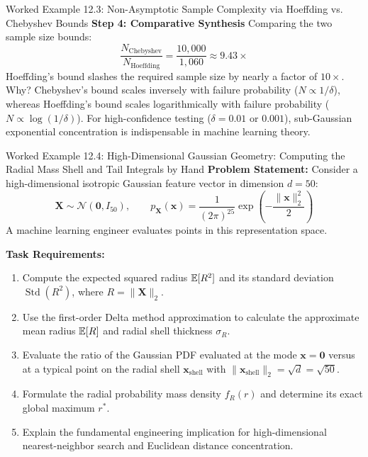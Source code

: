 \begin{examplebox}[breakable]{Worked Example 12.3: Non-Asymptotic Sample Complexity via Hoeffding vs. Chebyshev Bounds}
\textbf{Step 4: Comparative Synthesis}
Comparing the two sample size bounds:
\begin{equation}
\frac{N_{\text{Chebyshev}}}{N_{\text{Hoeffding}}} = \frac{10{,}000}{1{,}060} \approx \mathbf{9.43\times}
\end{equation}
Hoeffding's bound slashes the required sample size by nearly a factor of $10\times$. 
Why? Chebyshev's bound scales inversely with failure probability ($N \propto 1/\delta$), whereas Hoeffding's bound scales logarithmically with failure probability ($N \propto \log(1/\delta)$). For high-confidence testing ($\delta = 0.01$ or $0.001$), sub-Gaussian exponential concentration is indispensable in machine learning theory.
\end{examplebox}

\begin{examplebox}[breakable]{Worked Example 12.4: High-Dimensional Gaussian Geometry: Computing the Radial Mass Shell and Tail Integrals by Hand}
\textbf{Problem Statement:}
Consider a high-dimensional isotropic Gaussian feature vector in dimension $d = 50$:
\begin{equation}
\mathbf{X} \sim \mathcal{N}(\mathbf{0}, I_{50}), \qquad p_{\mathbf{X}}(\mathbf{x}) = \frac{1}{(2\pi)^{25}} \exp\left( -\frac{\|\mathbf{x}\|_2^2}{2} \right)
\end{equation}
A machine learning engineer evaluates points in this representation space.

\textbf{Task Requirements:}
\begin{enumerate}
    \item Compute the expected squared radius $\operatorname{\mathbb{E}}[R^2]$ and its standard deviation $\operatorname{Std}(R^2)$, where $R = \|\mathbf{X}\|_2$.
    \item Use the first-order Delta method approximation to calculate the approximate mean radius $\operatorname{\mathbb{E}}[R]$ and radial shell thickness $\sigma_R$.
    \item Evaluate the ratio of the Gaussian PDF evaluated at the mode $\mathbf{x} = \mathbf{0}$ versus at a typical point on the radial shell $\mathbf{x}_{\text{shell}}$ with $\|\mathbf{x}_{\text{shell}}\|_2 = \sqrt{d} = \sqrt{50}$.
    \item Formulate the radial probability mass density $f_R(r)$ and determine its exact global maximum $r^*$.
    \item Explain the fundamental engineering implication for high-dimensional nearest-neighbor search and Euclidean distance concentration.
\end{enumerate}


\end{examplebox}
